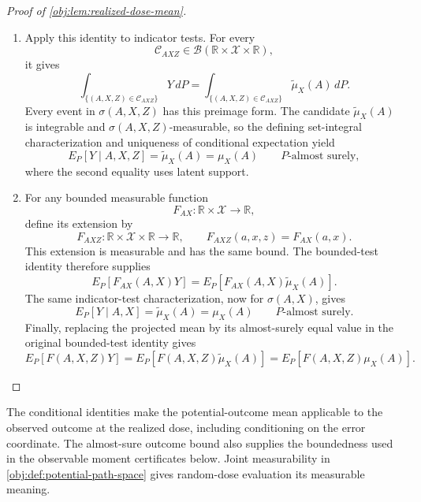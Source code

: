 \documentclass[11pt]{article}
\begin{document}
\begin{proof}[Proof of \cref{obj:lem:realized-dose-mean}]
\begin{enumerate}
Substituting this equality into the two stratum sums proves, for every bounded measurable \(F\),
\[
E_P[F(A,X,Z)Y]
=
E_P[F(A,X,Z)\widetilde\mu_X(A)].
\]

\item Apply this identity to indicator tests. For every
\[
\mathcal C_{AXZ}\in\mathcal B(\mathbb R\times\mathcal X\times\mathbb R),
\]
it gives
\[
\int_{\{(A,X,Z)\in\mathcal C_{AXZ}\}}Y\,dP
=
\int_{\{(A,X,Z)\in\mathcal C_{AXZ}\}}\widetilde\mu_X(A)\,dP.
\]
Every event in \(\sigma(A,X,Z)\) has this preimage form. The candidate
\(\widetilde\mu_X(A)\) is integrable and \(\sigma(A,X,Z)\)-measurable, so the defining set-integral characterization and uniqueness of conditional expectation yield
\[
E_P[Y\mid A,X,Z]=\widetilde\mu_X(A)
=\mu_X(A)
\qquad P\text{-almost surely},
\]
where the second equality uses latent support.

\item For any bounded measurable function
\[
F_{AX}:\mathbb R\times\mathcal X\longrightarrow\mathbb R,
\]
define its extension by
\[
F_{AXZ}:\mathbb R\times\mathcal X\times\mathbb R\longrightarrow\mathbb R,
\qquad
F_{AXZ}(a,x,z)=F_{AX}(a,x).
\]
This extension is measurable and has the same bound. The bounded-test identity therefore supplies
\[
E_P[F_{AX}(A,X)Y]
=
E_P[F_{AX}(A,X)\widetilde\mu_X(A)].
\]
The same indicator-test characterization, now for \(\sigma(A,X)\), gives
\[
E_P[Y\mid A,X]=\widetilde\mu_X(A)
=\mu_X(A)
\qquad P\text{-almost surely}.
\]
Finally, replacing the projected mean by its almost-surely equal value in the original bounded-test identity gives
\[
E_P[F(A,X,Z)Y]
=
E_P[F(A,X,Z)\widetilde\mu_X(A)]
=
E_P[F(A,X,Z)\mu_X(A)].
\]
\end{enumerate}
\end{proof}

The conditional identities make the potential-outcome mean applicable to the observed outcome at the realized dose, including conditioning on the error coordinate. The almost-sure outcome bound also supplies the boundedness used in the observable moment certificates below. Joint measurability in \cref{obj:def:potential-path-space} gives random-dose evaluation its measurable meaning.
\end{document}
